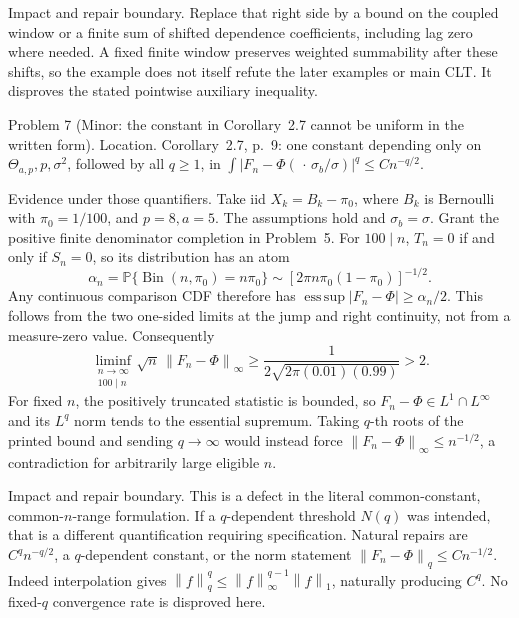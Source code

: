 \documentclass[10pt]{article}
\begin{document}
Impact and repair boundary. Replace that right side by a bound on the coupled window or a finite sum of shifted dependence coefficients, including lag zero where needed. A fixed finite window preserves weighted summability after these shifts, so the example does not itself refute the later examples or main CLT. It disproves the stated pointwise auxiliary inequality.\par
Problem 7 (Minor: the constant in Corollary 2.7 cannot be uniform in the written form).  Location. Corollary 2.7, p. 9: one constant depending only on \(\Theta_{a,p},p,\sigma^2\), followed by all \(q\ge1\), in \(\int|F_n-\Phi(\,\cdot\,\sigma_b/\sigma)|^q\le Cn^{-q/2}\).\par
Evidence under those quantifiers. Take iid \(X_k=B_k-\pi_0\), where \(B_k\) is Bernoulli with \(\pi_0=1/100\), and \(p=8,a=5\). The assumptions hold and \(\sigma_b=\sigma\). Grant the positive finite denominator completion in Problem 5. For \(100\mid n\), \(T_n=0\) if and only if \(S_n=0\), so its distribution has an atom \[\alpha_n=\mathbb P\{\operatorname{Bin}(n,\pi_0)=n\pi_0\}
\sim[2\pi n\pi_0(1-\pi_0)]^{-1/2}.\] Any continuous comparison CDF therefore has \(\operatorname*{ess\,sup}|F_n-\Phi|\ge\alpha_n/2\). This follows from the two one-sided limits at the jump and right continuity, not from a measure-zero value. Consequently \[\liminf_{\substack{n\to\infty\\100\mid n}}
\sqrt n\,\left\|F_n-\Phi\right\|_\infty
\ge\frac1{2\sqrt{2\pi(0.01)(0.99)}}>2.\] For fixed \(n\), the positively truncated statistic is bounded, so \(F_n-\Phi\in L^1\cap L^\infty\) and its \(L^q\) norm tends to the essential supremum. Taking \(q\)-th roots of the printed bound and sending \(q\to\infty\) would instead force \(\left\|F_n-\Phi\right\|_\infty\le n^{-1/2}\), a contradiction for arbitrarily large eligible \(n\).\par
Impact and repair boundary. This is a defect in the literal common-constant, common-\(n\)-range formulation. If a \(q\)-dependent threshold \(N(q)\) was intended, that is a different quantification requiring specification. Natural repairs are \(C^q n^{-q/2}\), a \(q\)-dependent constant, or the norm statement \(\left\|F_n-\Phi\right\|_q\le Cn^{-1/2}\). Indeed interpolation gives \(\left\|f\right\|_q^q\le\left\|f\right\|_\infty^{q-1}\left\|f\right\|_1\), naturally producing \(C^q\). No fixed-\(q\) convergence rate is disproved here.\par
\end{document}
